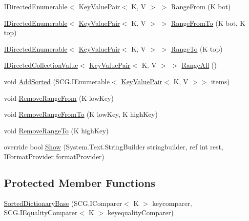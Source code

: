 \begin{DoxyCompactItemize}
\item 
\hyperlink{interface_c5_1_1_i_directed_enumerable}{I\+Directed\+Enumerable}$<$ \hyperlink{struct_c5_1_1_key_value_pair}{Key\+Value\+Pair}$<$ K, V $>$ $>$ \hyperlink{class_c5_1_1_sorted_dictionary_base_a17f1e0b03dd1d7a492a603770a2ca74e}{Range\+From} (K bot)
\item 
\hyperlink{interface_c5_1_1_i_directed_enumerable}{I\+Directed\+Enumerable}$<$ \hyperlink{struct_c5_1_1_key_value_pair}{Key\+Value\+Pair}$<$ K, V $>$ $>$ \hyperlink{class_c5_1_1_sorted_dictionary_base_a78cd02f8bae2478badd0d33b34441a98}{Range\+From\+To} (K bot, K top)
\item 
\hyperlink{interface_c5_1_1_i_directed_enumerable}{I\+Directed\+Enumerable}$<$ \hyperlink{struct_c5_1_1_key_value_pair}{Key\+Value\+Pair}$<$ K, V $>$ $>$ \hyperlink{class_c5_1_1_sorted_dictionary_base_a394e2b010e2defab09dcab046476003c}{Range\+To} (K top)
\item 
\hyperlink{interface_c5_1_1_i_directed_collection_value}{I\+Directed\+Collection\+Value}$<$ \hyperlink{struct_c5_1_1_key_value_pair}{Key\+Value\+Pair}$<$ K, V $>$ $>$ \hyperlink{class_c5_1_1_sorted_dictionary_base_a5ab793b9555a83e4695ffd96a97c6603}{Range\+All} ()
\item 
void \hyperlink{class_c5_1_1_sorted_dictionary_base_a849988aed0a97d3fce79bc5e0999c6cb}{Add\+Sorted} (S\+C\+G.\+I\+Enumerable$<$ \hyperlink{struct_c5_1_1_key_value_pair}{Key\+Value\+Pair}$<$ K, V $>$$>$ items)
\item 
void \hyperlink{class_c5_1_1_sorted_dictionary_base_a6a25e2fb4de6283ab0c5a7c06ae01455}{Remove\+Range\+From} (K low\+Key)
\item 
void \hyperlink{class_c5_1_1_sorted_dictionary_base_a72d594540619185a5b9e17f6e900b822}{Remove\+Range\+From\+To} (K low\+Key, K high\+Key)
\item 
void \hyperlink{class_c5_1_1_sorted_dictionary_base_accd7ef0c631ed4c542f33232e0cfbecc}{Remove\+Range\+To} (K high\+Key)
\item 
override bool \hyperlink{class_c5_1_1_sorted_dictionary_base_a50e6f00ff1d600fe0a5e5cc70d211d44}{Show} (System.\+Text.\+String\+Builder stringbuilder, ref int rest, I\+Format\+Provider format\+Provider)
\end{DoxyCompactItemize}
\subsection*{Protected Member Functions}
\begin{DoxyCompactItemize}
\item 
\hyperlink{class_c5_1_1_sorted_dictionary_base_a097fe60688de7c61e8d70c8cbde83e60}{Sorted\+Dictionary\+Base} (S\+C\+G.\+I\+Comparer$<$ K $>$ keycomparer, S\+C\+G.\+I\+Equality\+Comparer$<$ K $>$ keyequality\+Comparer)
\end{DoxyCompactItemize}
